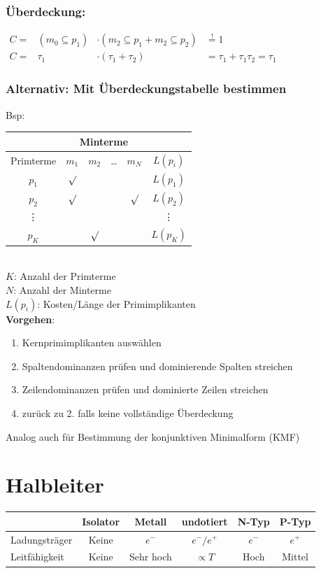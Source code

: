 \documentclass[6pt,a4paper]{scrartcl}
\begin{document}
\begin{multicols*}{3}
	\subsubsection{Überdeckung:} $\begin{array}{rccl} C = & (m_0 \subseteq p_1) & \cdot (m_2 \subseteq p_1 + m_2 \subseteq p_2) & \stackrel{!}=1 \\ C = & \tau_1 & \cdot (\tau_1 + \tau_2) & = \tau_1 + \tau_1 \tau_2 = \tau_1 \end{array}$ \\
	\subsubsection{Alternativ: Mit Überdeckungstabelle bestimmen} Bsp:\\
	\begin{tabular}{|c|c|c|c|c|c|}
		\hline
		          &      \multicolumn{4}{c|}{Minterme}  &      \\ \hline
		Primterme &  $m_1$  &  $m_2$  & \dots &  $m_N$  & $L(p_i)$   \\ \bottomrule[1pt]
		  $p_1$   & $\surd$ &         &       &         & $L(p_1)$   \\ \hline
		  $p_2$   & $\surd$ &         &       & $\surd$ & $L(p_2)$   \\ \hline
		 \vdots   &         &         &       &         &  \vdots    \\ \hline
		  $p_K$   &         & $\surd$ &       &         & $L(p_K)$   \\ \hline
	\end{tabular} \\
	$K$: Anzahl der Primterme\\
	$N$: Anzahl der Minterme \\
	$L(p_i)$: Kosten/Länge der Primimplikanten\\
	\textbf{Vorgehen}:
	\begin{enumerate}
	\item Kernprimimplikanten auswählen
	\item Spaltendominanzen prüfen und dominierende Spalten streichen
	\item Zeilendominanzen prüfen und dominierte Zeilen streichen
	\item zurück zu 2. falls keine vollständige Überdeckung
	\end{enumerate}
	Analog auch für Bestimmung der konjunktiven Minimalform (KMF)
\section{Halbleiter}
\begin{tabular}{l|c|c|c|c|c}
	& Isolator & Metall & undotiert & N-Typ & P-Typ \\ \hline
	Ladungsträger & Keine & $e^-$ & $e^- / e^+$ & $e^-$ & $e^+$ \\
	Leitfähigkeit & Keine & Sehr hoch & $\propto T$ & Hoch & Mittel\\  
\end{tabular}


\end{multicols*}
\end{document}
